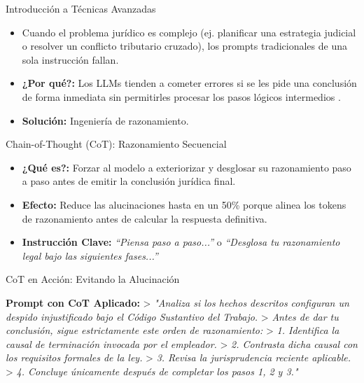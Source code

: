 \documentclass[aspectratio=169]{beamer}
\begin{document}
\begin{frame}[fragile]{Introducción a Técnicas Avanzadas}


\begin{itemize}
  \item Cuando el problema jurídico es complejo (ej. planificar una estrategia judicial o resolver un conflicto tributario cruzado), los prompts tradicionales de una sola instrucción fallan.
  \item \textbf{¿Por qué?:} Los LLMs tienden a cometer errores si se les pide una conclusión de forma inmediata sin permitirles procesar los pasos lógicos intermedios \cite{openai2023}.
  \item \textbf{Solución:} Ingeniería de razonamiento.
\end{itemize}
\end{frame}



\begin{frame}[fragile]{Chain-of-Thought (CoT): Razonamiento Secuencial}


\begin{itemize}
  \item \textbf{¿Qué es?:} Forzar al modelo a exteriorizar y desglosar su razonamiento paso a paso antes de emitir la conclusión jurídica final.
  \item \textbf{Efecto:} Reduce las alucinaciones hasta en un 50\% porque alinea los tokens de razonamiento antes de calcular la respuesta definitiva.
  \item \textbf{Instrucción Clave:} \textit{``Piensa paso a paso...''} o \textit{``Desglosa tu razonamiento legal bajo las siguientes fases...''}
\end{itemize}
\end{frame}



\begin{frame}[fragile]{CoT en Acción: Evitando la Alucinación}


\textbf{Prompt con CoT Aplicado:}
> \textit{"Analiza si los hechos descritos configuran un despido injustificado bajo el Código Sustantivo del Trabajo.}
> \textit{Antes de dar tu conclusión, sigue estrictamente este orden de razonamiento:}
> \textit{1. Identifica la causal de terminación invocada por el empleador.}
> \textit{2. Contrasta dicha causal con los requisitos formales de la ley.}
> \textit{3. Revisa la jurisprudencia reciente aplicable.}
> \textit{4. Concluye únicamente después de completar los pasos 1, 2 y 3."}

\end{frame}
\end{document}
